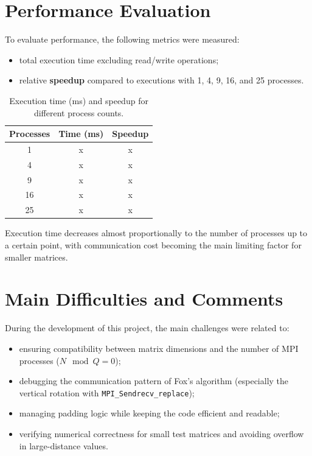 \documentclass[10pt,a4paper]{article}
\begin{document}
\section{Performance Evaluation}
To evaluate performance, the following metrics were measured:
\begin{itemize}
  \item total execution time excluding read/write operations;
  \item relative \textbf{speedup} compared to executions with 1, 4, 9, 16, and 25 processes.
\end{itemize}

\begin{table}[H]
  \centering
  \caption{Execution time (ms) and speedup for different process counts.}
  \begin{tabular}{ccc}
    \toprule
    \textbf{Processes} & \textbf{Time (ms)} & \textbf{Speedup} \\
    \midrule
    1  & x & x \\
    4  & x  & x \\
    9  & x  & x \\
    16 & x   & x \\
    25 & x   & x \\
    \bottomrule
  \end{tabular}
\end{table}

Execution time decreases almost proportionally to the number of processes up to a certain point, with communication cost becoming the main limiting factor for smaller matrices.

\section{Main Difficulties and Comments}
During the development of this project, the main challenges were related to:
\begin{itemize}
  \item ensuring compatibility between matrix dimensions and the number of MPI processes (\(N \mod Q = 0\));
  \item debugging the communication pattern of Fox's algorithm (especially the vertical rotation with \texttt{MPI\_Sendrecv\_replace});
  \item managing padding logic while keeping the code efficient and readable;
  \item verifying numerical correctness for small test matrices and avoiding overflow in large-distance values.
\end{itemize}
\end{document}
